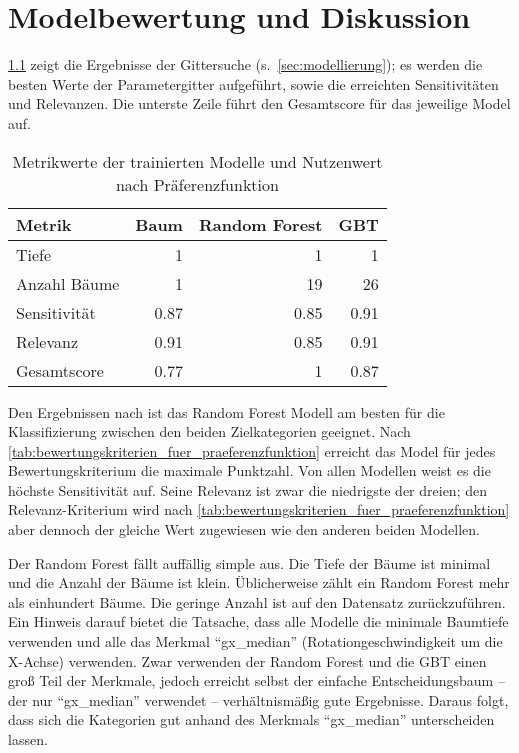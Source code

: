 \chapter{Modelbewertung und Diskussion}
\label{ch:modelbewertung}
\cref{tab:metrikwerte_der_trainierten_modelle} zeigt die Ergebnisse der Gittersuche (s.~\cref{sec:modellierung}); es werden die besten Werte der Parametergitter aufgeführt, sowie die erreichten Sensitivitäten und Relevanzen. Die unterste Zeile führt den Gesamtscore für das jeweilige Model auf.

\begin{table}[ht]
	\raggedright
	\begin{tabularx}{\textwidth}{ | l | r | r | r|}
		\hline
		\rowcolor{lightgray}
		Metrik & Baum & Random Forest & GBT\\
		\hline
		Tiefe & 1 & 1 & 1\\
		Anzahl Bäume & 1 & 19 & 26\\
		Sensitivität & \num{0.87} & \num{0.85} & \num{0.91}\\
		Relevanz & \num{0.91} & \num{0.85} & \num{0.91}\\
		\hline
		\hline
		Gesamtscore & \num{0.77} & \num{1} & \num{0.87}\\
		\hline
	\end{tabularx}
	\caption{Metrikwerte der trainierten Modelle und Nutzenwert nach Präferenzfunktion}%
	\label{tab:metrikwerte_der_trainierten_modelle}	%
\end{table}

Den Ergebnissen nach ist das Random Forest Modell am besten für die Klassifizierung zwischen den beiden Zielkategorien geeignet. Nach \cref{tab:bewertungskriterien_fuer_praeferenzfunktion} erreicht das Model für jedes Bewertungskriterium die maximale Punktzahl. Von allen Modellen weist es die höchste Sensitivität auf. Seine Relevanz ist zwar die niedrigste der dreien; den Relevanz-Kriterium wird nach \cref{tab:bewertungskriterien_fuer_praeferenzfunktion} aber dennoch der gleiche Wert zugewiesen wie den anderen beiden Modellen.

Der Random Forest fällt auffällig simple aus. Die Tiefe der Bäume ist minimal und die Anzahl der Bäume ist klein. Üblicherweise zählt ein Random Forest mehr als einhundert Bäume. Die geringe Anzahl ist auf den Datensatz zurückzuführen. Ein Hinweis darauf bietet die Tatsache, dass alle Modelle die minimale Baumtiefe verwenden und alle das Merkmal \enquote{gx\_median} (Rotationgeschwindigkeit um die X-Achse) verwenden. Zwar verwenden der Random Forest und die GBT einen groß Teil der Merkmale, jedoch erreicht selbst der einfache Entscheidungsbaum -- der nur \enquote{gx\_median} verwendet -- verhältnismäßig gute Ergebnisse. Daraus folgt, dass sich die Kategorien gut anhand des Merkmals \enquote{gx\_median} unterscheiden lassen.

